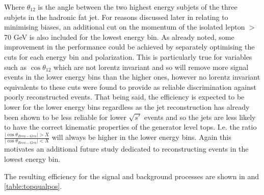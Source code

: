 Where $\theta_{12}$ is the angle between the two highest energy subjets of the three subjets in the hadronic fat jet. For reasons discussed later in  relating to minimising biases, an additional cut on the momentum of the isolated lepton $>$ 70 GeV is also included for the lowest energy bin. As already noted, some improvement in the performance could be achieved by separately optimising the cuts for each energy bin and polarization. This is particularly true for variables such as $\cos\theta_{12}$ which are not lorentz invariant and so will remove more signal events in the lower energy bins than the higher ones, however no lorentz invariant equivalents to these cuts were found to provide as reliable discrimination against poorly reconstructed events. That being said, the efficiency is expected to be lower for the lower energy bins regardless as the jet reconstruction has already been shown to be less reliable for lower $\sqrt{s'}$ events and so the jets are less likely to have the correct kinematic properties of the generator level tops. I.e. the ratio  $\frac{|\cos\theta_{Reco-Gen}| > X}{|\cos\theta_{Reco-Gen}| < X}$ will always be higher in the lower energy bins. Again this motivates an additional future study dedicated to reconstructing events in the lowest energy bin.

The resulting efficiency for the signal and background processes are shown in  and \ref{table:topqualpos}.

